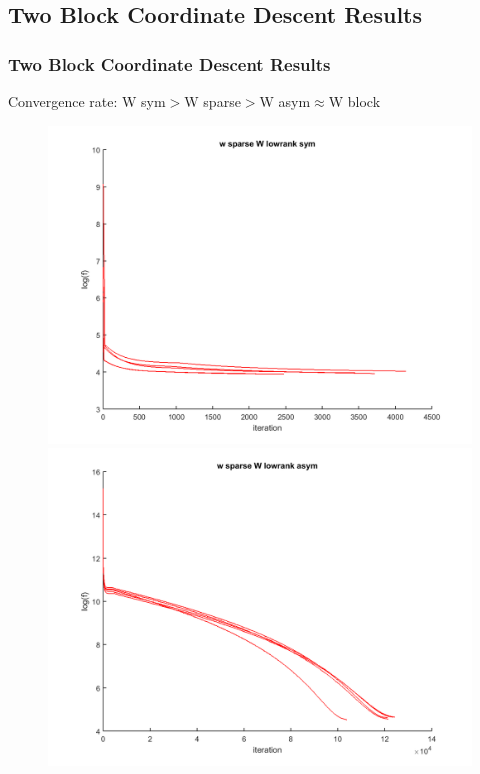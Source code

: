 \documentclass{beamer}
\begin{document}
\subsection{Two Block Coordinate Descent Results}
\begin{frame}
\frametitle{Two Block Coordinate Descent Results}
Convergence rate: W sym$>$W sparse$>$W asym$\approx$W block
  \begin{figure}[htbp]
  \centering
  \begin{minipage}{0.45\textwidth}
    \centering
    \includegraphics[width=1\textwidth]{w_sparse_W_lowrank_sym_p10_figure.png}
  \end{minipage}
  \hfill
  \begin{minipage}{0.45\textwidth}
    \centering
    \includegraphics[width=1\textwidth]{w_sparse_W_lowrank_asym_p10_figure.png}

\end{minipage}
\end{figure}
\end{frame}
\end{document}

